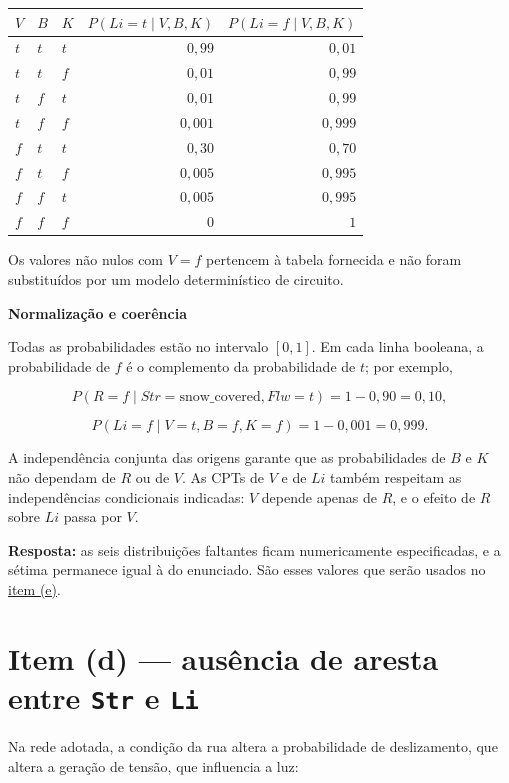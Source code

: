 \documentclass[11pt,a4paper]{article}
\newcommand{\itemtitle}[2]{\section*{\textcolor{accent}{Item (#1) --- #2}}}
\newcommand{\subtitulo}[1]{\par\medskip\textbf{\textcolor{accent}{#1}}\par}
\begin{document}
{\def\LTcaptype{none} %
\begin{longtable}[]{@{}lllrr@{}}
\toprule\noalign{}
\(V\) & \(B\) & \(K\) & \(P(Li=t\mid V,B,K)\) & \(P(Li=f\mid V,B,K)\) \\
\midrule\noalign{}
\endhead
\bottomrule\noalign{}
\endlastfoot
\(t\) & \(t\) & \(t\) & \(0{,}99\) & \(0{,}01\) \\
\(t\) & \(t\) & \(f\) & \(0{,}01\) & \(0{,}99\) \\
\(t\) & \(f\) & \(t\) & \(0{,}01\) & \(0{,}99\) \\
\(t\) & \(f\) & \(f\) & \(0{,}001\) & \(0{,}999\) \\
\(f\) & \(t\) & \(t\) & \(0{,}30\) & \(0{,}70\) \\
\(f\) & \(t\) & \(f\) & \(0{,}005\) & \(0{,}995\) \\
\(f\) & \(f\) & \(t\) & \(0{,}005\) & \(0{,}995\) \\
\(f\) & \(f\) & \(f\) & \(0\) & \(1\) \\
\end{longtable}
}

Os valores não nulos com \(V=f\) pertencem à tabela fornecida e não foram substituídos por um modelo determinístico de circuito.

\subtitulo{Normalização e coerência}\label{normalizauxe7uxe3o-e-coeruxeancia}

Todas as probabilidades estão no intervalo \([0,1]\). Em cada linha booleana, a probabilidade de \(f\) é o complemento da probabilidade de \(t\); por exemplo,

\[
P(R=f\mid Str=\text{snow\_covered},Flw=t)=1-0{,}90=0{,}10,
\]

\[
P(Li=f\mid V=t,B=f,K=f)=1-0{,}001=0{,}999.
\]

A independência conjunta das origens garante que as probabilidades de \(B\) e \(K\) não dependam de \(R\) ou de \(V\). As CPTs de \(V\) e de \(Li\) também respeitam as independências condicionais indicadas: \(V\) depende apenas de \(R\), e o efeito de \(R\) sobre \(Li\) passa por \(V\).

\textbf{Resposta:} as seis distribuições faltantes ficam numericamente especificadas, e a sétima permanece igual à do enunciado. São esses valores que serão usados no \hyperref[item-e]{item (e)}.

\clearpage
\itemtitle{d}{\texorpdfstring{ausência de aresta entre \texttt{Str} e \texttt{Li}}{ausência de aresta entre Str e Li}}\label{item-d}

Na rede adotada, a condição da rua altera a probabilidade de deslizamento, que altera a geração de tensão, que influencia a luz:
\end{document}
